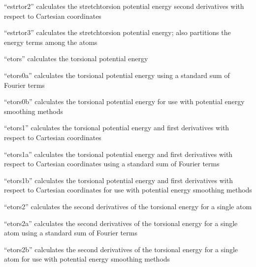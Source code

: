 \documentclass[letterpaper,11pt,english]{sphinxmanual}
\begin{document}

“estrtor2” calculates the stretch\sphinxhyphen{}torsion potential energy second derivatives with respect to Cartesian coordinates


“estrtor3” calculates the stretch\sphinxhyphen{}torsion potential energy; also partitions the energy terms among the atoms


“etors” calculates the torsional potential energy


“etors0a” calculates the torsional potential energy using a standard sum of Fourier terms


“etors0b” calculates the torsional potential energy for use with potential energy smoothing methods


“etors1” calculates the torsional potential energy and first derivatives with respect to Cartesian coordinates


“etors1a” calculates the torsional potential energy and first derivatives with respect to Cartesian coordinates using a standard sum of Fourier terms


“etors1b” calculates the torsional potential energy and first derivatives with respect to Cartesian coordinates for use with potential energy smoothing methods


“etors2” calculates the second derivatives of the torsional energy for a single atom


“etors2a” calculates the second derivatives of the torsional energy for a single atom using a standard sum of Fourier terms


“etors2b” calculates the second derivatives of the torsional energy for a single atom for use with potential energy smoothing methods

\end{document}
